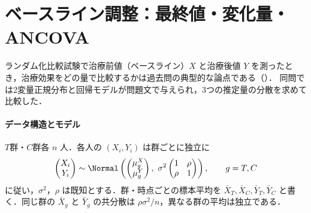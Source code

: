 \section{ベースライン調整：最終値・変化量・ANCOVA}\label{sec:08-ancova}
\Hinshutsu
ランダム化比較試験で治療前値（ベースライン）$X$ と治療後値 $Y$ を測ったとき，治療効果をどの量で比較するかは過去問の典型的な論点である（）．
同問では2変量正規分布と回帰モデルが問題文で与えられ，3つの推定量の分散を求めて比較した．

\paragraph{データ構造とモデル}
$T$群・$C$群各 $n$ 人．各人の $(X_i,Y_i)$ は群ごとに独立に
\[
\begin{pmatrix}X_i\\Y_i\end{pmatrix}\sim\Normal\left(\begin{pmatrix}\mu_g^X\\\mu_g^Y\end{pmatrix},\ \sigma^2\begin{pmatrix}1&\rho\\\rho&1\end{pmatrix}\right),\qquad g=T,C
\]
に従い，$\sigma^2$，$\rho$ は既知とする．群・時点ごとの標本平均を $\bar X_T,\bar X_C,\bar Y_T,\bar Y_C$ と書く．同じ群の $\bar X_g$ と $\bar Y_g$ の共分散は $\rho\sigma^2/n$，異なる群の平均は独立である．

